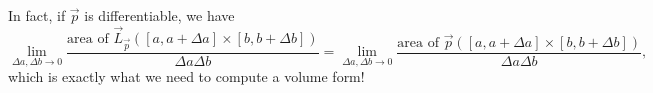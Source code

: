 In fact, if $\vec p$ is differentiable, we have
\[
	\lim_{\Delta a,\Delta b\to0} \frac{\text{area of }\vec L_{\vec p}([a,a+\Delta a]\times [b,b+\Delta b])}{\Delta a\Delta b}
	=
	\lim_{\Delta a,\Delta b\to0} \frac{\text{area of }\vec p([a,a+\Delta a]\times [b,b+\Delta b])}{\Delta a\Delta b},
\]
which is exactly what we need to compute a volume form!

\begin{exercises}
\end{exercises}
